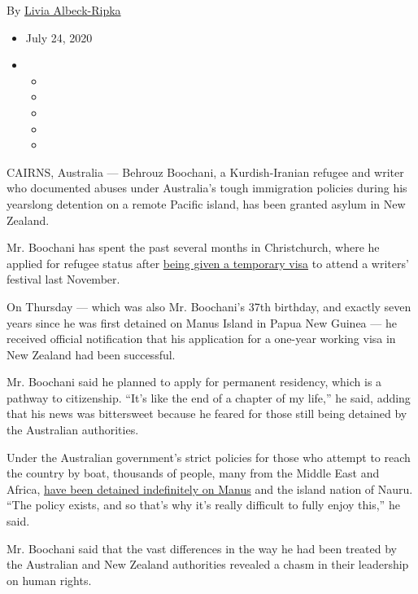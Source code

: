By \href{https://www.nytimes3xbfgragh.onion/by/livia-albeck-ripka}{Livia
Albeck-Ripka}

\begin{itemize}
\item
  July 24, 2020
\item
  \begin{itemize}
  \item
  \item
  \item
  \item
  \item
  \end{itemize}
\end{itemize}

CAIRNS, Australia --- Behrouz Boochani, a Kurdish-Iranian refugee and
writer who documented abuses under Australia's tough immigration
policies during his yearslong detention on a remote Pacific island, has
been granted asylum in New Zealand.

Mr. Boochani has spent the past several months in Christchurch, where he
applied for refugee status after
\href{https://www.nytimes3xbfgragh.onion/2019/11/14/world/australia/behrouz-boochani-refugee.html}{being
given a temporary visa} to attend a writers' festival last November.

On Thursday --- which was also Mr. Boochani's 37th birthday, and exactly
seven years since he was first detained on Manus Island in Papua New
Guinea --- he received official notification that his application for a
one-year working visa in New Zealand had been successful.

Mr. Boochani said he planned to apply for permanent residency, which is
a pathway to citizenship. ``It's like the end of a chapter of my life,''
he said, adding that his news was bittersweet because he feared for
those still being detained by the Australian authorities.

Under the Australian government's strict policies for those who attempt
to reach the country by boat, thousands of people, many from the Middle
East and Africa,
\href{https://www.nytimes3xbfgragh.onion/interactive/2017/11/18/world/australia/manus-island-australia-detainees.html}{have
been detained indefinitely on Manus} and the island nation of Nauru.
``The policy exists, and so that's why it's really difficult to fully
enjoy this,'' he said.

Mr. Boochani said that the vast differences in the way he had been
treated by the Australian and New Zealand authorities revealed a chasm
in their leadership on human rights.

